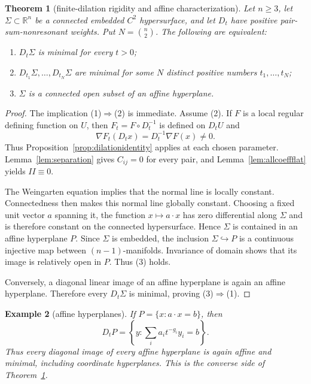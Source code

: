 \documentclass[preprint,12pt]{elsarticle}
\numberwithin{equation}{section}
\newtheorem{theorem}{Theorem}[section]
\newtheorem{example}[theorem]{Example}
\theoremstyle{definition}\newtheorem{definition}[theorem]{Definition}
\theoremstyle{remark}\newtheorem{remark}[theorem]{Remark}
\begin{document}
\begin{theorem}[finite-dilation rigidity and affine characterization]\label{thm:main}
Let $n\ge3$, let $\Sigma\subset\mathbb R^n$ be a connected embedded $C^2$ hypersurface, and let $D_t$ have positive pair-sum-nonresonant weights. Put $N=\binom n2$. The following are equivalent:
\begin{enumerate}
\item $D_t\Sigma$ is minimal for every $t>0$;
\item $D_{t_1}\Sigma,\ldots,D_{t_N}\Sigma$ are minimal for some $N$ distinct positive numbers $t_1,\ldots,t_N$;
\item $\Sigma$ is a connected open subset of an affine hyperplane.
\end{enumerate}
\end{theorem}
\begin{proof}
The implication (1)$\Rightarrow$(2) is immediate. Assume (2). If $F$ is a local regular defining function on $U$, then $F_t=F\circ D_t^{-1}$ is defined on $D_tU$ and
\[
\nabla F_t(D_tx)=D_t^{-1}\nabla F(x)\ne0.
\]
Thus Proposition~\ref{prop:dilationidentity} applies at each chosen parameter. Lemma~\ref{lem:separation} gives $C_{ij}=0$ for every pair, and Lemma~\ref{lem:allcoeffflat} yields $II\equiv0$.

The Weingarten equation implies that the normal line is locally constant. Connectedness then makes this normal line globally constant. Choosing a fixed unit vector $a$ spanning it, the function $x\mapsto a\cdot x$ has zero differential along $\Sigma$ and is therefore constant on the connected hypersurface. Hence $\Sigma$ is contained in an affine hyperplane $P$. Since $\Sigma$ is embedded, the inclusion $\Sigma\hookrightarrow P$ is a continuous injective map between $(n-1)$-manifolds. Invariance of domain shows that its image is relatively open in $P$. Thus (3) holds.

Conversely, a diagonal linear image of an affine hyperplane is again an affine hyperplane. Therefore every $D_t\Sigma$ is minimal, proving (3)$\Rightarrow$(1).
\end{proof}

\begin{example}[affine hyperplanes]\label{ex:affine}
If $P=\{x:a\cdot x=b\}$, then
\[
D_tP=\left\{y:\sum_i a_it^{-g_i}y_i=b\right\}.
\]
Thus every diagonal image of every affine hyperplane is again affine and minimal, including coordinate hyperplanes. This is the converse side of Theorem~\ref{thm:main}.
\end{example}
\end{document}
